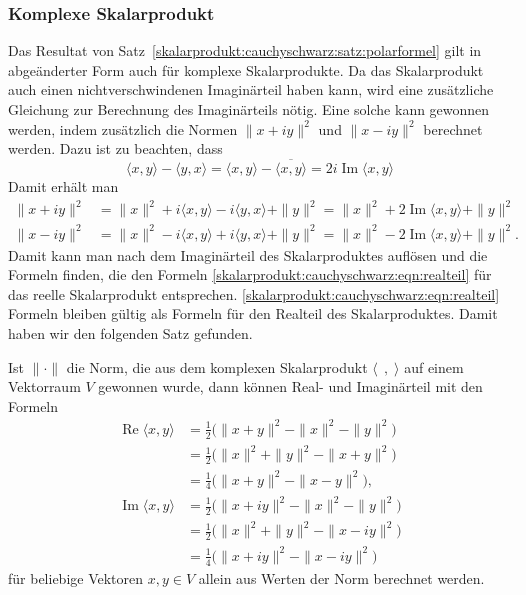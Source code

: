 %
%
\subsubsection{Komplexe Skalarprodukt}
Das Resultat von Satz~\ref{skalarprodukt:cauchyschwarz:satz:polarformel}
gilt in abgeänderter Form auch für komplexe Skalarprodukte.
Da das Skalarprodukt auch einen nichtverschwindenen Imaginärteil haben
kann, wird eine zusätzliche Gleichung zur Berechnung des Imaginärteils
nötig.
Eine solche kann gewonnen werden, indem zusätzlich die Normen
$\|x+iy\|^2$ und $\|x-iy\|^2$ berechnet werden.
Dazu ist zu beachten, dass
\[
\langle x,y\rangle
-
\langle y,x\rangle
=
\langle x,y\rangle
-
\overline{
\langle x,y\rangle
}
=
2i\operatorname{Im}\langle x,y\rangle
\]
Damit erhält man
\begin{align*}
\|x+iy\|^2 &= \|x\|^2 + i\langle x,y\rangle - i\langle y,x\rangle + \|y\|^2 
           = \|x\|^2 + 2\operatorname{Im}\langle x,y\rangle + \|y\|^2 \\
\|x-iy\|^2 &= \|x\|^2 - i\langle x,y\rangle + i\langle y,x\rangle + \|y\|^2 
           = \|x\|^2 - 2\operatorname{Im}\langle x,y\rangle + \|y\|^2.
\end{align*}
Damit kann man nach dem Imaginärteil des Skalarproduktes auflösen und
die Formeln
finden, die den Formeln
\eqref{skalarprodukt:cauchyschwarz:eqn:realteil}
für das reelle Skalarprodukt entsprechen.
\eqref{skalarprodukt:cauchyschwarz:eqn:realteil}
Formeln bleiben gültig als Formeln für den Realteil des Skalarproduktes.
Damit haben wir den folgenden Satz gefunden.

\begin{satz}
Ist $\|\cdot\|$ die Norm, die aus dem komplexen Skalarprodukt
$\langle\;\,,\;\rangle$ auf einem Vektorraum $V$ gewonnen wurde,
dann können Real- und Imaginärteil mit den Formeln
\begin{align*}
\operatorname{Re}\langle x,y\rangle
&=
{\textstyle\frac12}\bigl(
\|x+y\|^2 - \|x\|^2 -\|y\|^2
\bigr)
\\
&=
{\textstyle\frac12}\bigl(
\|x\|^2 +\|y\|^2 - \|x+y\|^2
\bigr)
\\
&=
{\textstyle\frac14}\bigl(
\|x+y\|^2 - \|x-y\|^2
\bigr),
\\
\operatorname{Im}\langle x,y\rangle
&=
{\textstyle\frac12}\bigl(
\|x+iy\|^2-\|x\|^2-\|y\|^2
\bigr)
\\
&=
{\textstyle\frac12}\bigl(
\|x\|^2+\|y\|^2-\|x-iy\|^2
\bigr)
\\
&=
{\textstyle\frac14}\bigl(
\|x+iy\|^2
-
\|x-iy\|^2
\bigr)
\end{align*}
für beliebige Vektoren $x,y\in V$
allein aus Werten der Norm berechnet werden.
\end{satz}

